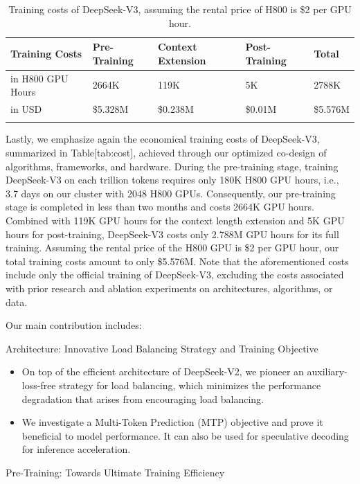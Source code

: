 \documentclass[11pt,a4paper]{article}
\begin{document}
\begin{table}[h]
\caption{Training costs of DeepSeek-V3, assuming the rental price of H800 is \$2 per GPU hour.}
\begin{tabular}{|l|l|l|l|l|}
\hline
Training Costs & Pre-Training & Context Extension & Post-Training & Total \\ \hline
in H800 GPU Hours & 2664K & 119K & 5K & 2788K \\ \hline
in USD & \$5.328M & \$0.238M & \$0.01M & \$5.576M \\ \hline
 &  &  &  &  \\ \hline
\end{tabular}
\end{table}

Lastly, we emphasize again the economical training costs of DeepSeek-V3, summarized in Table[tab:cost], achieved through our optimized co-design of algorithms, frameworks, and hardware. During the pre-training stage, training DeepSeek-V3 on each trillion tokens requires only 180K H800 GPU hours, i.e., 3.7 days on our cluster with 2048 H800 GPUs. Consequently, our pre-training stage is completed in less than two months and costs 2664K GPU hours. Combined with 119K GPU hours for the context length extension and 5K GPU hours for post-training, DeepSeek-V3 costs only 2.788M GPU hours for its full training. Assuming the rental price of the H800 GPU is \$2 per GPU hour, our total training costs amount to only \$5.576M. Note that the aforementioned costs include only the official training of DeepSeek-V3, excluding the costs associated with prior research and ablation experiments on architectures, algorithms, or data.

Our main contribution includes:

Architecture: Innovative Load Balancing Strategy and Training Objective

\begin{itemize}
\item On top of the efficient architecture of DeepSeek-V2, we pioneer an auxiliary-loss-free strategy for load balancing, which minimizes the performance degradation that arises from encouraging load balancing.
\item We investigate a Multi-Token Prediction (MTP) objective and prove it beneficial to model performance. It can also be used for speculative decoding for inference acceleration.
\end{itemize}

Pre-Training: Towards Ultimate Training Efficiency
\end{document}
